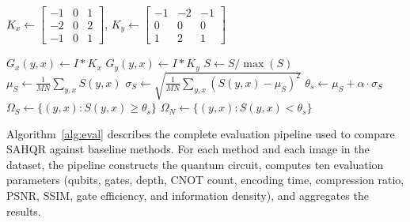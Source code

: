 \documentclass{ipol}
\begin{document}
\begin{algorithm}[!htbp]
\caption{Saliency Detection and Region Partitioning}\label{alg:saliency}
\BlankLine
{}
$K_x \gets \begin{bmatrix} -1 & 0 & 1 \\ -2 & 0 & 2 \\ -1 & 0 & 1 \end{bmatrix}$,
$K_y \gets \begin{bmatrix} -1 & -2 & -1 \\ 0 & 0 & 0 \\ 1 & 2 & 1 \end{bmatrix}$

$G_x(y,x) \gets I \ast K_x$ 
$G_y(y,x) \gets I \ast K_y$ 
\BlankLine
{}
$S \gets S / \max(S)$ 
\BlankLine
{}
$\mu_S \gets \frac{1}{MN} \sum_{y,x} S(y,x)$ 
$\sigma_S \gets \sqrt{\frac{1}{MN} \sum_{y,x} (S(y,x) - \mu_S)^2}$ 
$\theta_s \gets \mu_S + \alpha \cdot \sigma_S$ 
\BlankLine
{}
$\Omega_S \gets \{(y,x) : S(y,x) \geq \theta_s\}$ 
$\Omega_N \gets \{(y,x) : S(y,x) < \theta_s\}$ 
\end{algorithm}

\clearpage

Algorithm~\ref{alg:eval} describes the complete evaluation pipeline used to compare SAHQR against baseline methods. For each method and each image in the dataset, the pipeline constructs the quantum circuit, computes ten evaluation parameters (qubits, gates, depth, CNOT count, encoding time, compression ratio, PSNR, SSIM, gate efficiency, and information density), and aggregates the results.
\end{document}
